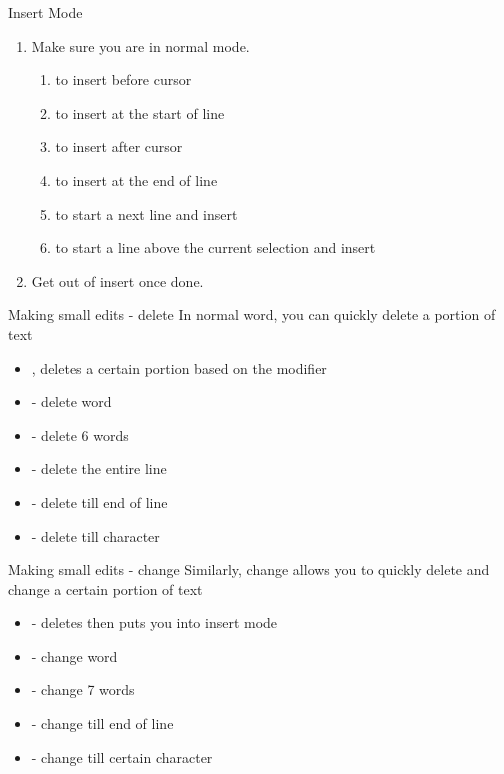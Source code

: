 \documentclass[12pt]{beamer}
\begin{document}
\begin{frame}{Insert Mode}
    \begin{enumerate}
        \item Make sure you are in normal mode. 
        \begin{enumerate}
            \item {} to insert before cursor
            \item {} to insert at the start of line
            \item {} to insert after cursor
            \item {} to insert at the end of line
            \item {} to start a next line and insert
            \item {} to start a line above the current selection and insert
        \end{enumerate}{}
        \item Get out of insert once done. 
    \end{enumerate}{}
\end{frame}{}

\begin{frame}{Making small edits - delete}
    In normal word, you can quickly delete a portion of text
    \begin{itemize}
        \item {}, deletes a certain portion based on the modifier
        \item {} - delete word
        \item {} - delete 6 words
        \item {} - delete the entire line
        \item {} - delete till end of line
        \item {} - delete till character
    \end{itemize}{}
\end{frame}{}

\begin{frame}{Making small edits - change}
    Similarly, change allows you to quickly delete and change a certain portion of text
    \begin{itemize}
        \item {} - deletes then puts you into insert mode
        \item {} - change word
        \item {} - change 7 words
        \item {} - change till end of line
        \item {} - change till certain character
    \end{itemize}{}
\end{frame}{}
\end{document}
